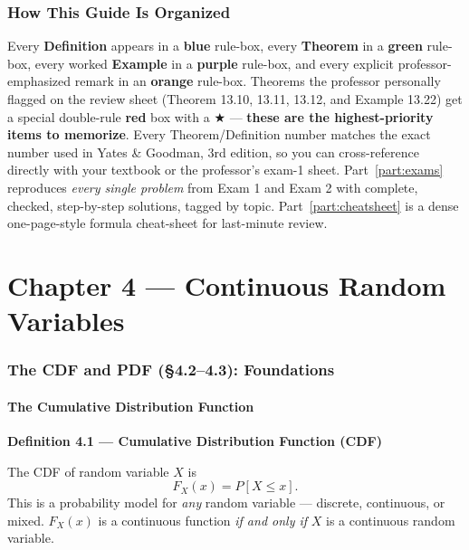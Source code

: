 \documentclass[11pt]{article}
\renewcommand{\P}[1]{P\left[#1\right]}
\newcommand{\topline}[1]{\par\vspace{5pt}\noindent{\color{#1}\rule{\linewidth}{1.1pt}}\par\vspace{3pt}}
\newcommand{\botline}[1]{\par\vspace{2pt}\noindent{\color{#1}\rule{\linewidth}{1.1pt}}\par\vspace{8pt}}
\newenvironment{defbox}[2]{%
  \topline{defcol}\noindent\textbf{\color{defcol}Definition #1 --- #2}\par\smallskip\noindent\ignorespaces
}{\botline{defcol}}
\begin{document}
\section*{How This Guide Is Organized}

Every \textbf{Definition} appears in a \textcolor{defcol}{\textbf{blue}} rule-box, every
\textbf{Theorem} in a \textcolor{thmcol}{\textbf{green}} rule-box, every worked
\textbf{Example} in a \textcolor{exmcol}{\textbf{purple}} rule-box, and every explicit
professor-emphasized remark in an \textcolor{notecol}{\textbf{orange}} rule-box. Theorems the
professor personally flagged on the review sheet (Theorem 13.10, 13.11, 13.12, and Example
13.22) get a special double-rule \textcolor{flagcol}{\textbf{red}} box with a $\bigstar$ ---
\textbf{these are the highest-priority items to memorize}. Every Theorem/Definition number
matches the exact number used in Yates \& Goodman, 3rd edition, so you can cross-reference
directly with your textbook or the professor's exam-1 sheet. Part~\ref{part:exams} reproduces
\emph{every single problem} from Exam 1 and Exam 2 with complete, checked, step-by-step
solutions, tagged by topic. Part~\ref{part:cheatsheet} is a dense one-page-style formula
cheat-sheet for last-minute review.

\clearpage
\part{Chapter 4 --- Continuous Random Variables}
\section{The CDF and PDF (\S4.2--4.3): Foundations}

\subsection{The Cumulative Distribution Function}

\begin{defbox}{4.1}{Cumulative Distribution Function (CDF)}
The CDF of random variable $X$ is
\[ F_X(x) = \P{X \le x}. \]
This is a probability model for \emph{any} random variable --- discrete, continuous, or mixed.
$F_X(x)$ is a continuous function \emph{if and only if} $X$ is a continuous random variable.
\end{defbox}
\end{document}
